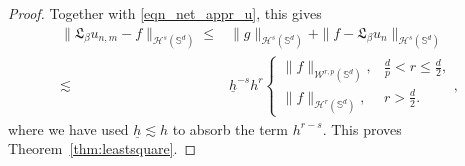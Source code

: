 \documentclass[10pt,a4paper]{amsart}
\def\SS{\mathbb{S}}
\begin{document}
\begin{proof}
Together with \eqref{eqn_net_appr_u}, this gives
\begin{equation}
    \begin{split}
        \|\mathfrak L_\beta u_{n,m}-f\|_{\mathcal H^s(\SS^d)}
        \leq&\|g\|_{\mathcal H^s(\SS^d)}
        +\|f-\mathfrak L_\beta u_n\|_{\mathcal H^s(\SS^d)}\\
        \lesssim&\underline h^{-s}h^r
        \left\{\begin{array}{ll}
            \|f\|_{\mathcal W^{r,p}(\SS^d)},&\frac dp<r\leq\frac d2,\\[0.3em]
            \|f\|_{\mathcal H^r(\SS^d)},&r>\frac d2.
        \end{array}\right.,
    \end{split}
\end{equation}
where we have used $\underline h\lesssim h$ to absorb the term $h^{r-s}$. This proves Theorem~\ref{thm:leastsquare}.
\end{proof}
\end{document}
